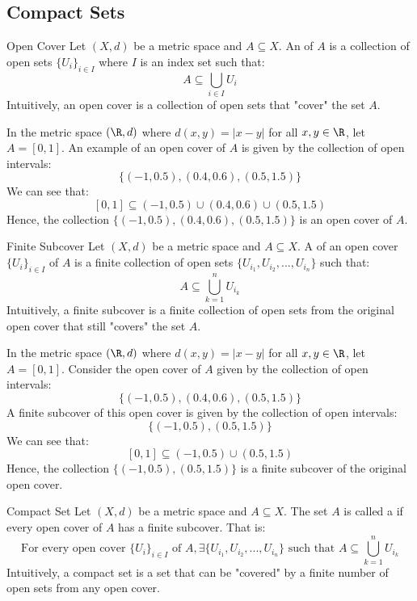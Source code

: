 \documentclass[openany]{book}
\begin{document}
\subsection{Compact Sets}
\begin{mydefinition}{Open Cover}
    Let $(X, d)$ be a metric space and $A \subseteq X$. An  of $A$ is a collection of open sets $\{U_i\}_{i \in I}$ where $I$ is an index set such that:
    $$A \subseteq \bigcup_{i \in I} U_i$$
    Intuitively, an open cover is a collection of open sets that "cover" the set $A$.
\end{mydefinition}
\begin{example}
    In the metric space $(\R, d)$ where $d(x, y) = |x - y|$ for all $x, y \in \R$, let $A = [0, 1]$. An example of an open cover of $A$ is given by the collection of open intervals:
    $$\{(-1, 0.5), (0.4, 0.6), (0.5, 1.5)\}$$
    We can see that:
    $$[0, 1] \subseteq (-1, 0.5) \cup (0.4, 0.6) \cup (0.5, 1.5)$$
    Hence, the collection $\{(-1, 0.5), (0.4, 0.6), (0.5, 1.5)\}$ is an open cover of $A$.
\end{example}
\begin{mydefinition}{Finite Subcover}
    Let $(X, d)$ be a metric space and $A \subseteq X$. A  of an open cover $\{U_i\}_{i \in I}$ of $A$ is a finite collection of open sets $\{U_{i_1}, U_{i_2}, ..., U_{i_n}\}$ such that:
    $$A \subseteq \bigcup_{k=1}^{n} U_{i_k}$$
    Intuitively, a finite subcover is a finite collection of open sets from the original open cover that still "covers" the set $A$.
\end{mydefinition}
\begin{example}
    In the metric space $(\R, d)$ where $d(x, y) = |x - y|$ for all $x, y \in \R$, let $A = [0, 1]$. Consider the open cover of $A$ given by the collection of open intervals:
    $$\{(-1, 0.5), (0.4, 0.6), (0.5, 1.5)\}$$
    A finite subcover of this open cover is given by the collection of open intervals:
    $$\{(-1, 0.5), (0.5, 1.5)\}$$
    We can see that:
    $$[0, 1] \subseteq (-1, 0.5) \cup (0.5, 1.5)$$
    Hence, the collection $\{(-1, 0.5), (0.5, 1.5)\}$ is a finite subcover of the original open cover.
\end{example}
\begin{mydefinition}{Compact Set}
    Let $(X, d)$ be a metric space and $A \subseteq X$. The set $A$ is called a  if every open cover of $A$ has a finite subcover. That is:
    $$\text{For every open cover } \{U_i\}_{i \in I} \text{ of } A, \exists \{U_{i_1}, U_{i_2}, ..., U_{i_n}\} \text{ such that } A \subseteq \bigcup_{k=1}^{n} U_{i_k}$$
    Intuitively, a compact set is a set that can be "covered" by a finite number of open sets from any open cover.
\end{mydefinition}
\end{document}
